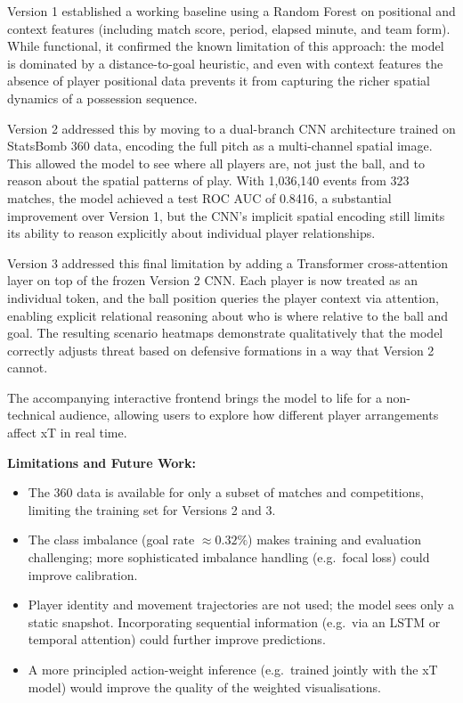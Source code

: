 \documentclass{article}
\begin{document}
Version 1 established a working baseline using a Random Forest on positional and context features (including match score, period, elapsed minute, and team form). While functional, it confirmed the known limitation of this approach: the model is dominated by a distance-to-goal heuristic, and even with context features the absence of player positional data prevents it from capturing the richer spatial dynamics of a possession sequence.

Version 2 addressed this by moving to a dual-branch CNN architecture trained on StatsBomb 360 data, encoding the full pitch as a multi-channel spatial image. This allowed the model to see where all players are, not just the ball, and to reason about the spatial patterns of play. With 1,036,140 events from 323 matches, the model achieved a test ROC AUC of 0.8416, a substantial improvement over Version 1, but the CNN's implicit spatial encoding still limits its ability to reason explicitly about individual player relationships.

Version 3 addressed this final limitation by adding a Transformer cross-attention layer on top of the frozen Version 2 CNN. Each player is now treated as an individual token, and the ball position queries the player context via attention, enabling explicit relational reasoning about who is where relative to the ball and goal. The resulting scenario heatmaps demonstrate qualitatively that the model correctly adjusts threat based on defensive formations in a way that Version 2 cannot.

The accompanying interactive frontend brings the model to life for a non-technical audience, allowing users to explore how different player arrangements affect xT in real time.

\textbf{Limitations and Future Work:}
\begin{itemize}
    \item The 360 data is available for only a subset of matches and competitions, limiting the training set for Versions 2 and 3.
    \item The class imbalance (goal rate $\approx 0.32\%$) makes training and evaluation challenging; more sophisticated imbalance handling (e.g.\ focal loss) could improve calibration.
    \item Player identity and movement trajectories are not used; the model sees only a static snapshot. Incorporating sequential information (e.g.\ via an LSTM or temporal attention) could further improve predictions.
    \item A more principled action-weight inference (e.g.\ trained jointly with the xT model) would improve the quality of the weighted visualisations.
\end{itemize}
\end{document}
